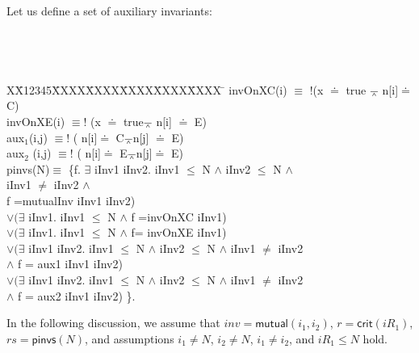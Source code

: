 \documentclass[final]{IEEEtran}
\newlength{\fminilength}
\newenvironment{fmini}[1][\linewidth]
  {\setlength{\fminilength}{#1\fboxsep-2\fboxrule}%
   \vspace{2ex}\noindent\begin{lrbox}{\fminibox}\begin{minipage}{\fminilength}%
   \mbox{ }\hfill\vspace{-2.5ex}}%
  {\end{minipage}\end{lrbox}\vspace{1ex}\hspace{0ex}%
   \framebox{\usebox{\fminibox}}}
\newenvironment{specification}
{\noindent\scriptsize
\tt\begin{fmini}\begin{tabbing}X\=X12345\=XXXX\=XXXX\=XXXX\=XXXX\=XXXX
\=\+\kill} {\end{tabbing}\normalfont\end{fmini}}
\def \eqc {\doteq }
\def \andc {\barwedge }
\def \negc {!}
\def \iInv {iInv}
\begin{document}
\begin{example}\label{example2}
Let us define a set of auxiliary invariants:

\begin{specification}
invOnXC(i)  $\equiv$ $\negc$(x $\doteq$ true $\andc$ n[i]$\doteq$ C)   \\

invOnXE(i)   $\equiv \negc$ (x $\doteq$ true$\andc$ n[i] $\doteq$ E)  \\


aux$_1$(i,j)   $\equiv \negc$ ( n[i]$\doteq$ C$\andc$n[j] $\doteq$ E)  \\

aux$_2$ (i,j) $\equiv \negc$  ( n[i]$\doteq$ E$\andc$n[j]$\doteq$ E)\\

  pinvs(N)$\equiv$ \{f. $\exists$ \iInv1 \iInv2. \iInv1 $\le$ N $\wedge$ \iInv2 $\le$ N $\wedge$\\
   \iInv1 $\ne$ \iInv2 $\wedge$   \\
   f =mutualInv   \iInv1 \iInv2) \\
 $ \vee(\exists$ \iInv1. \iInv1 $\le$ N $\wedge$  f =invOnXC  \iInv1)   \\
$\vee(\exists$ \iInv1. \iInv1 $\le$ N $\wedge$  f= invOnXE \iInv1)    \\
$\vee(\exists$ \iInv1 \iInv2. \iInv1 $\le$ N $\wedge$ \iInv2 $\le$ N $\wedge$ \iInv1 $\ne$ \iInv2 \\
$\wedge$ f =  aux1  \iInv1 \iInv2) \\
$\vee(\exists$ \iInv1 \iInv2. \iInv1 $\le$ N $\wedge$ \iInv2 $\le$ N $\wedge$ \iInv1 $\ne$ \iInv2 \\
$\wedge$ f =  aux2  \iInv1 \iInv2) \}.

\end{specification}

In the following discussion, we assume that $inv=\mathsf{mutual} (i_1,i_2)$, $r=\mathsf{crit}(iR_1)$, $rs= \mathsf{pinvs} (N)$, and  assumptions  $i_1 \neq N$, $i_2 \neq N$, $i_1 \neq i_2$, and $iR_1 \leq N$ hold.

\begin{itemize}


\end{itemize}
\end{example}
\end{document}
